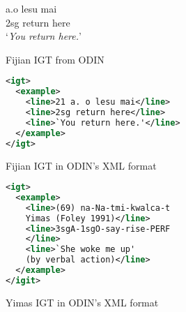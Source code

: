 \begin{figure}[t]
 a.\quad o lesu mai \\
\indent \qquad\qquad 2sg return here \\
\indent \qquad\qquad `\emph{You return here.}' \\
\caption{Fijian IGT from ODIN} \label{fig:odin_fijian}
\end{figure}


\begin{figure}[t]
\small
\begin{lstlisting}[language=XML]
<igt>
  <example>
    <line>21 a. o lesu mai</line>
    <line>2sg return here</line>
    <line>`You return here.'</line>
  </example>
</igt>
\end{lstlisting} 
\caption{Fijian IGT in ODIN's XML format} \label{fig:odin_fijian_xml}
\end{figure}




\begin{figure}[t]
\small
\begin{lstlisting}[language=XML]
<igt>
  <example>
    <line>(69) na-Na-tmi-kwalca-t 
    Yimas (Foley 1991)</line>
    <line>3sgA-1sgO-say-rise-PERF
    </line>
    <line>`She woke me up' 
    (by verbal action)</line>
  </example>
</igit>
\end{lstlisting} 
\smallskip
\caption{Yimas IGT in ODIN's XML format}\label{fig:odin_yimas_xml}
\end{figure}



